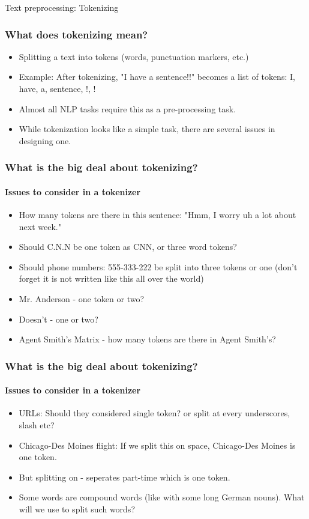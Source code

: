 \documentclass{beamer}
\begin{document}
\begin{frame}
\begin{center}
\Large Text preprocessing: Tokenizing
\end{center}
\end{frame}

\begin{frame}
\frametitle{What does tokenizing mean?}
\begin{itemize}
\item Splitting a text into tokens (words, punctuation markers, etc.)
\item Example: After tokenizing, "I have a sentence!!" becomes a list of tokens: I, have, a, sentence, !, !
\item Almost all NLP tasks require this as a pre-processing task.
\item While tokenization looks like a simple task, there are several issues in designing one.
\end{itemize}
\end{frame}

\begin{frame}
\frametitle{What is the big deal about tokenizing?}
\framesubtitle{Issues to consider in a tokenizer}
\begin{itemize}
\item How many tokens are there in this sentence: "Hmm, I worry uh a lot about next week." \pause
\item Should C.N.N be one token as CNN, or three word tokens? \pause
\item Should phone numbers: 555-333-222 be split into three tokens or one (don't forget it is not written like this all over the world) \pause
\item Mr. Anderson - one token or two? \pause
\item Doesn't - one or two? \pause
\item Agent Smith's Matrix - how many tokens are there in Agent Smith's?
\end{itemize}
\end{frame}

\begin{frame}
\frametitle{What is the big deal about tokenizing?}
\framesubtitle{Issues to consider in a tokenizer}
\begin{itemize}
\item URLs: Should they considered single token? or split at every underscores, slash etc?
\item Chicago-Des Moines flight: If we split this on space, Chicago-Des Moines is one token.
\item But splitting on - seperates part-time which is one token.
\item Some words are compound words (like with some long German nouns). What will we use to split such words? 
\end{itemize}
\end{frame}
\end{document}
